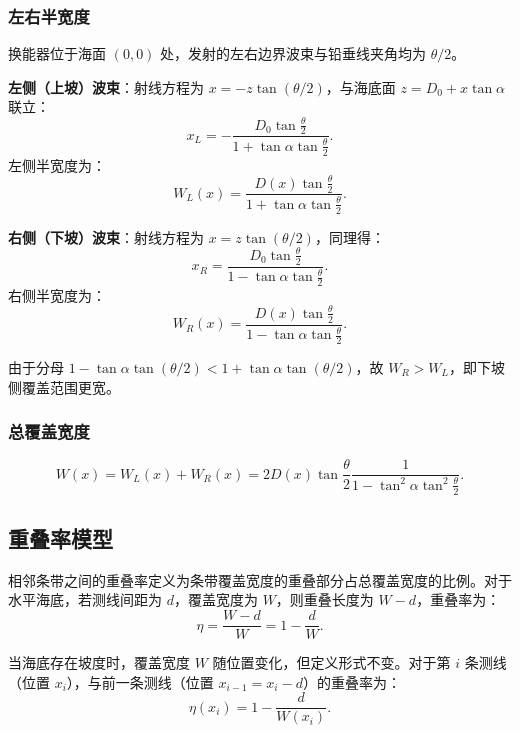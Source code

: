 \documentclass[12pt,a4paper]{ctexart}
\begin{document}
 \subsubsection{左右半宽度}
 
 换能器位于海面 $(0,0)$ 处，发射的左右边界波束与铅垂线夹角均为 $\theta/2$。
 
 \textbf{左侧（上坡）波束}：射线方程为 $x = -z\tan(\theta/2)$，与海底面 $z = D_0 + x\tan\alpha$ 联立：
 \[
     x_L = -\frac{D_0\tan\frac{\theta}{2}}{1 + \tan\alpha\tan\frac{\theta}{2}}.
 \]
 左侧半宽度为：
 \begin{equation}\label{eq:WL}
     W_L(x) = \frac{D(x)\tan\frac{\theta}{2}}{1 + \tan\alpha\tan\frac{\theta}{2}}.
 \end{equation}
 
 \textbf{右侧（下坡）波束}：射线方程为 $x = z\tan(\theta/2)$，同理得：
 \[
     x_R = \frac{D_0\tan\frac{\theta}{2}}{1 - \tan\alpha\tan\frac{\theta}{2}}.
 \]
 右侧半宽度为：
 \begin{equation}\label{eq:WR}
     W_R(x) = \frac{D(x)\tan\frac{\theta}{2}}{1 - \tan\alpha\tan\frac{\theta}{2}}.
 \end{equation}
 
 由于分母 $1 - \tan\alpha\tan(\theta/2) < 1 + \tan\alpha\tan(\theta/2)$，故 $W_R > W_L$，即下坡侧覆盖范围更宽。
 
 \subsubsection{总覆盖宽度}
 
 \begin{equation}\label{eq:W}
     W(x) = W_L(x) + W_R(x)
          = 2D(x)\tan\frac{\theta}{2}
            \frac{1}{1 - \tan^2\alpha\tan^2\frac{\theta}{2}}.
 \end{equation}
 
 \subsection{重叠率模型}
 
 相邻条带之间的重叠率定义为条带覆盖宽度的重叠部分占总覆盖宽度的比例。对于水平海底，若测线间距为 $d$，覆盖宽度为 $W$，则重叠长度为 $W-d$，重叠率为：
 \begin{equation}\label{eq:eta_def}
     \eta = \frac{W-d}{W} = 1 - \frac{d}{W}.
 \end{equation}
 
 当海底存在坡度时，覆盖宽度 $W$ 随位置变化，但定义形式不变。对于第 $i$ 条测线（位置 $x_i$），与前一条测线（位置 $x_{i-1} = x_i - d$）的重叠率为：
 \begin{equation}\label{eq:eta_slope}
     \eta(x_i) = 1 - \frac{d}{W(x_i)}.
 \end{equation}
 
\end{document}
